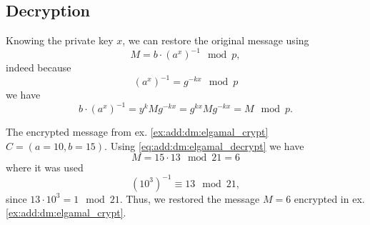 \subsection{Decryption}
Knowing the private key $x$, we can restore the original message using
\begin{equation}
M = b\cdot \left(a^x\right)^{-1} \mod p,
\label{eq:add:dm:elgamal_decrypt}
\end{equation}
indeed because
\[
\left(a^x\right)^{-1} = g^{-kx} \mod p
\]
we have
\[
b\cdot \left(a^x\right)^{-1} = 
y^k M g^{-kx} = g^{kx} M g^{-kx} = M \mod p.
\]
\begin{example}
The encrypted message from ex. \ref{ex:add:dm:elgamal_crypt} 
$C = (a=10, b=15)$. Using \eqref{eq:add:dm:elgamal_decrypt} we have
\[
M = 15 \cdot 13 \mod 21 = 6
\]
where it was used
\[
\left(10^3\right)^{-1} \equiv 13 \mod 21,
\]
since $13 \cdot 10^3 = 1 \mod 21$.
Thus, we restored the message $M=6$ encrypted in
ex. \ref{ex:add:dm:elgamal_crypt}.
\label{ex:add:dm:elgamal_crypt}
\end{example}